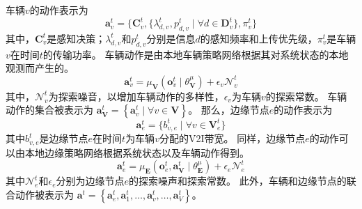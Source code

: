 车辆$v$的动作表示为 
\begin{equation}
	\boldsymbol{a}_{v}^{t} = \{ \mathbf{C}_v^t,  \{ \lambda_{d, v}^{t}, p_{d, v}^{t} \mid \forall d \in \mathbf{D}_{v}^t \} , \pi_v^t   \}
\end{equation}
其中，$\mathbf{C}_v^t$是感知决策；$\lambda_{d, v}^{t}$和$p_{d, v}^{t}$分别是信息$d$的感知频率和上传优先级，$\pi_v^t$是车辆$v$在时间$t$的传输功率。
车辆动作是由本地车辆策略网络根据其对系统状态的本地观测而产生的。
\begin{equation}
	\boldsymbol{a}_{v}^{t}=\mu_{\mathbf{V}}\left(\boldsymbol{o}_{v}^{t} \mid \theta_{\mathbf{V}}^{\mu}\right)+\epsilon_{v} \mathcal{N}_{v}^{t}
\end{equation}
\noindent 其中，$\mathcal{N}_{v}^{t}$为探索噪音，以增加车辆动作的多样性，$\epsilon_{v}$为车辆$v$的探索常数。
车辆动作的集合被表示为 $\boldsymbol{a}_{\mathbf{V}}^{t} = \left\{\boldsymbol{a}_{v}^{t}\mid \forall v \in \mathbf{V}\right\}$。
那么，边缘节点$e$的动作表示为
\begin{equation}
	\boldsymbol{a}_{e}^{t} = \{b_{v, e}^{t} \mid \forall v \in \mathbf{V}_{e}^{t}\}
\end{equation}
其中$b_{v, e}^t$是边缘节点$e$在时间$t$为车辆$v$分配的V2I带宽。
同样，边缘节点$e$的动作可以由本地边缘策略网络根据系统状态以及车辆动作得到。
\begin{equation}
	\boldsymbol{a}_{e}^{t}=\mu_{\mathbf{E}}\left(\boldsymbol{o}_{e}^{t},  \boldsymbol{a}_{\boldsymbol{\mathbf{V}}}^{t} \mid \theta_{\mathbf{E}}^{\mu}\right)+\epsilon_{e} \mathcal{N}_{e}^{t}
\end{equation}
\noindent 其中$\mathcal{N}_{e}^{t}$和$\epsilon_{e}$分别为边缘节点$e$的探索噪声和探索常数。
此外，车辆和边缘节点的联合动作被表示为 $\boldsymbol{a}^{t}= \left\{\boldsymbol{a}_{e}^{t}, \boldsymbol{a}_{1}^{t}, \ldots, \boldsymbol{a}_{v}^{t}, \ldots, \boldsymbol{a}_{V}^{t}\right\}$。

